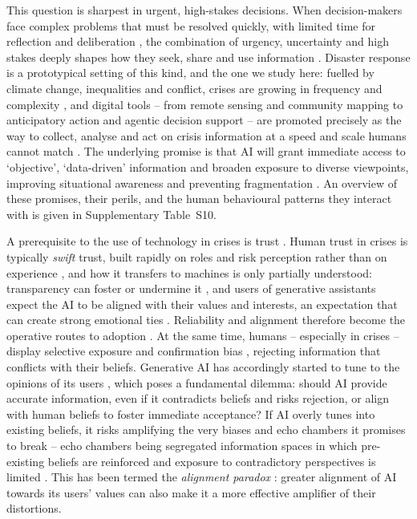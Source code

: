 \documentclass[pdflatex,sn-nature]{sn-jnl}
\begin{document}
This question is sharpest in urgent, high-stakes decisions. When decision-makers face complex problems that must be resolved quickly, with limited time for reflection and deliberation \citep{mendonca2001decision}, the combination of urgency, uncertainty and high stakes deeply shapes how they seek, share and use information \citep{comes2020coordination}. Disaster response is a prototypical setting of this kind, and the one we study here: fuelled by climate change, inequalities and conflict, crises are growing in frequency and complexity \citep{sogaard2024evolution}, and digital tools -- from remote sensing and community mapping to anticipatory action and agentic decision support -- are promoted precisely as the way to collect, analyse and act on crisis information at a speed and scale humans cannot match \citep{qadir2016crisis,voigt2007satellite,champlin2023measuring,thalheimer2022role,reichstein2025early,acharya2025agentic}. The underlying promise is that AI will grant immediate access to `objective', `data-driven' information and broaden exposure to diverse viewpoints, improving situational awareness and preventing fragmentation \citep{jeon2024hearhere,zhao2025tailoring}. An overview of these promises, their perils, and the human behavioural patterns they interact with is given in Supplementary Table~S10.

A prerequisite to the use of technology in crises is trust \citep{steinbrink2024transparency,albahri2024systematic}. Human trust in crises is typically \emph{swift} trust, built rapidly on roles and risk perception rather than on experience \citep{tatham2010application}, and how it transfers to machines is only partially understood: transparency can foster or undermine it \citep{visave2025transparency,tzachor2020artificial}, and users of generative assistants expect the AI to be aligned with their values and interests, an expectation that can create strong emotional ties \citep{kaplan2023trust,manzini2024should}. Reliability and alignment therefore become the operative routes to adoption \citep{glikson2020human,lee2004trust}. At the same time, humans -- especially in crises -- display selective exposure \citep{barbera2015tweeting} and confirmation bias \citep{paulus2024interplay}, rejecting information that conflicts with their beliefs. Generative AI has accordingly started to tune to the opinions of its users \citep{sharma2024generative}, which poses a fundamental dilemma: should AI provide accurate information, even if it contradicts beliefs and risks rejection, or align with human beliefs to foster immediate acceptance? If AI overly tunes into existing beliefs, it risks amplifying the very biases and echo chambers it promises to break \citep{ekstrom2022self} -- echo chambers being segregated information spaces in which pre-existing beliefs are reinforced and exposure to contradictory perspectives is limited \citep{jeon2024hearhere}. This has been termed the \emph{alignment paradox} \citep{west2025alignment}: greater alignment of AI towards its users' values can also make it a more effective amplifier of their distortions.
\end{document}
